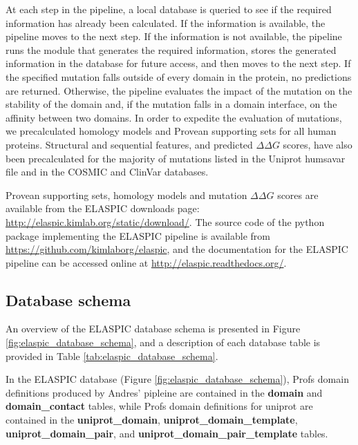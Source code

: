 At each step in the pipeline, a local database is queried to see if the required information has already been calculated. If the information is available, the pipeline moves to the next step. If the information is not available, the pipeline runs the module that generates the required information, stores the generated information in the database for future access, and then moves to the next step. If the specified mutation falls outside of every domain in the protein, no predictions are returned. Otherwise, the pipeline evaluates the impact of the mutation on the stability of the domain and, if the mutation falls in a domain interface, on the affinity between two domains. In order to expedite the evaluation of mutations, we precalculated homology models and Provean supporting sets for all human proteins. Structural and sequential features, and predicted $\Delta \Delta G$ scores, have also been precalculated for the majority of mutations listed in the Uniprot humsavar file \cite{consortium_uniprot:_2015} and in the COSMIC \cite{forbes_cosmic:_2015} and ClinVar \cite{landrum_clinvar:_2016} databases.

Provean supporting sets, homology models and mutation $\Delta \Delta G$ scores are available from the ELASPIC downloads page: \url{http://elaspic.kimlab.org/static/download/}. The source code of the python package implementing the ELASPIC pipeline is available from \url{https://github.com/kimlaborg/elaspic}, and the documentation for the ELASPIC pipeline can be accessed online at \url{http://elaspic.readthedocs.org/}.


\subsection{Database schema}

An overview of the ELASPIC database schema is presented in Figure \ref{fig:elaspic_database_schema}, and a description of each database table is provided in Table \ref{tab:elaspic_database_schema}.


In the ELASPIC database (Figure \ref{fig:elaspic_database_schema}), Profs domain definitions produced by Andres' pipleine are contained in the \textbf{domain} and \textbf{domain\_contact} tables, while Profs domain definitions for uniprot are contained in the \textbf{uniprot\_domain}, \textbf{uniprot\_domain\_template}, \textbf{uniprot\_domain\_pair}, and \textbf{uniprot\_domain\_pair\_template} tables.


